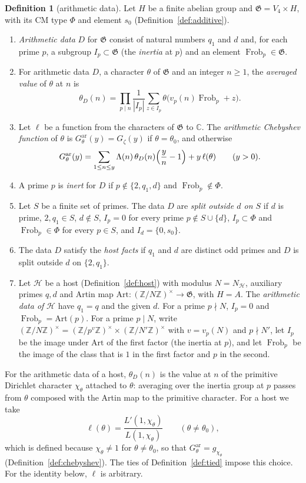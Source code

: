 \documentclass[11pt]{amsbook}
\theoremstyle{plain}
\theoremstyle{definition}
\newtheorem{definition}[theorem]{Definition}
\theoremstyle{remark}
\numberwithin{equation}{section}
\numberwithin{figure}{chapter}
\numberwithin{table}{chapter}
\newcommand{\Z}{\mathbb{Z}}
\renewcommand{\C}{\mathbb{C}}
\newcommand{\Gz}{G_{\zeta}}
\newcommand{\Frob}{\operatorname{Frob}}
\newcommand{\GG}{\mathfrak{G}}
\newcommand{\GPsi}{G^{\mathrm{ar}}}
\begin{document}
\begin{definition}[arithmetic data]\label{def:arithdata}
Let $H$ be a finite abelian group and $\GG=V_4\times H$, with its CM
type $\Phi$ and element $s_0$ (Definition~\ref{def:additive}).
\begin{enumerate}[label=(\arabic*)]
\item \emph{Arithmetic data} $D$ for $\GG$ consist of natural numbers
$q_1$ and $d$ and, for each prime $p$, a subgroup $I_p\subset\GG$ (the
\emph{inertia} at $p$) and an element $\Frob_p\in\GG$.
\item For arithmetic data $D$, a character $\theta$ of $\GG$ and an
integer $n\ge1$, the \emph{averaged value} of $\theta$ at $n$ is
\[
\theta_D(n)=\prod_{p\mid n}\frac{1}{|I_p|}\sum_{z\in I_p}
\theta\bigl(v_p(n)\Frob_p+z\bigr).
\]
\item Let $\ell$ be a function from the characters of $\GG$ to $\C$.
The \emph{arithmetic Chebyshev function} of $\theta$ is
$\GPsi_\theta(y)=\Gz(y)$ if $\theta=\theta_0$, and otherwise
\[
\GPsi_\theta(y)=\sum_{1\le n\le y}\Lambda(n)\,\theta_D(n)
\Bigl(\frac yn-1\Bigr)+y\,\ell(\theta)\qquad(y>0).
\]
\item A prime $p$ is \emph{inert} for $D$ if $p\notin\{2,q_1,d\}$ and
$\Frob_p\notin\Phi$.
\item Let $S$ be a finite set of primes. The data $D$ are \emph{split
outside $d$ on $S$} if $d$ is prime, $2,q_1\in S$, $d\notin S$,
$I_p=0$ for every prime $p\notin S\cup\{d\}$, $I_p\subset\Phi$ and
$\Frob_p\in\Phi$ for every $p\in S$, and $I_d=\{0,s_0\}$.
\item The data $D$ satisfy the \emph{host facts} if $q_1$ and $d$ are
distinct odd primes and $D$ is split outside $d$ on $\{2,q_1\}$.
\item Let $\mathcal H$ be a host (Definition~\ref{def:host}) with
modulus $N=N_{\mathcal H}$, auxiliary primes $q,d$ and Artin map
$\mathrm{Art}\colon(\Z/N\Z)^\times\to\GG$, with $H=A$. The
\emph{arithmetic data of} $\mathcal H$ have $q_1=q$ and the given
$d$. For a prime $p\nmid N$, $I_p=0$ and $\Frob_p=\mathrm{Art}(p)$.
For a prime $p\mid N$, write $(\Z/N\Z)^\times=(\Z/p^{v}\Z)^\times
\times(\Z/N'\Z)^\times$ with $v=v_p(N)$ and $p\nmid N'$, let $I_p$ be
the image under $\mathrm{Art}$ of the first factor (the inertia at
$p$), and let $\Frob_p$ be the image of the class that is $1$ in the
first factor and $p$ in the second.
\end{enumerate}
\end{definition}

\noindent For the arithmetic data of a host, $\theta_D(n)$ is the
value at $n$ of the primitive Dirichlet character $\chi_\theta$
attached to $\theta$: averaging over the inertia group at $p$ passes
from $\theta$ composed with the Artin map to the primitive
character. For a host we take
\[
\ell(\theta)=\frac{L'(1,\chi_\theta)}{L(1,\chi_\theta)}\qquad
(\theta\ne\theta_0),
\]
which is defined because $\chi_\theta\ne1$ for $\theta\ne\theta_0$, so
that $\GPsi_\theta=g_{\chi_\theta}$ (Definition~\ref{def:chebyshev}).
The ties of Definition~\ref{def:tied} impose this choice. For the
identity below, $\ell$ is arbitrary.
\end{document}
